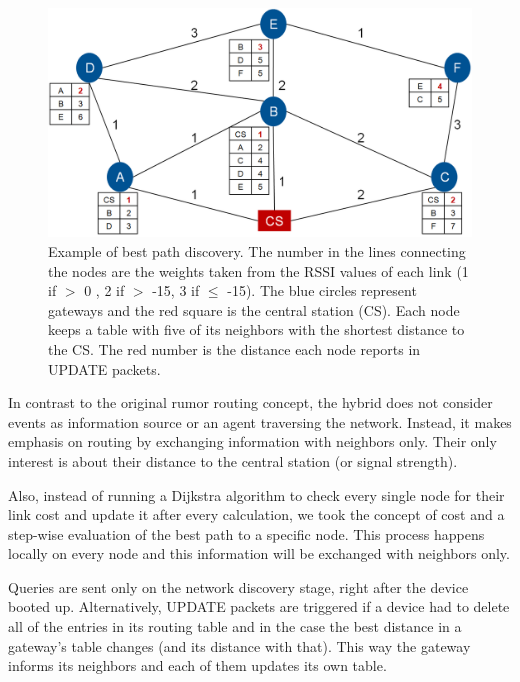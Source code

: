 \begin{figure}
    \centering
    \includegraphics[width=15cm]{images/Example_Routing.png}
	\vspace{-1.5em}
    \caption[Best path discovery example]{Example of best path discovery. 
	The number in the lines connecting the nodes are the weights taken from the RSSI values of each link (1 if \(>\) 0 , 2 if \(>\) -15, 3 if \(\leq\) -15).
	The blue circles represent gateways and the red square is the central station (CS).
	Each node keeps a table with five of its neighbors with the shortest distance to the CS.
	The red number is the distance each node reports in UPDATE packets.}
    \vspace{-1.5em}
    \label{fig:routing}
\end{figure}

In contrast to the original rumor routing concept, the hybrid does not consider events as information source or an agent traversing the network. 
Instead, it makes emphasis on routing by exchanging information with neighbors only. Their only interest is about their distance to the central station (or signal strength).

Also, instead of running a Dijkstra algorithm to check every single node for their link cost and update it after every calculation, we took the concept of cost and a step-wise evaluation of the best path to a specific node. This process happens locally on every node and this information will be exchanged with neighbors only. 

Queries are sent only on the network discovery stage, right after the device booted up. Alternatively, UPDATE packets are triggered if a device had to delete all of the entries in its routing table and in the case the best distance in a gateway's table changes (and its distance with that). This way the gateway informs its neighbors and each of them updates its own table.



